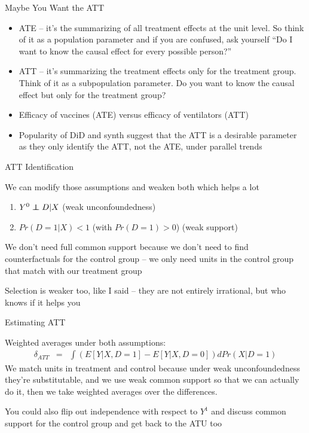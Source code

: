 \documentclass{beamer}
\newcommand\independent{\protect\mathpalette{\protect\independenT}{\perp}}
\def\independenT#1#2{\mathrel{\rlap{$#1#2$}\mkern2mu{#1#2}}}
\begin{document}
\begin{frame}{Maybe You Want the ATT}

\begin{itemize}
\item ATE -- it's the summarizing of all treatment effects at the unit level. So think of it as a population parameter and if you are confused, ask yourself ``Do I want to know the causal effect for every possible person?''
\item ATT -- it's summarizing the treatment effects only for the treatment group.  Think of it as a subpopulation parameter.  Do you want to know the causal effect but only for the treatment group?
\item Efficacy of vaccines (ATE) versus efficacy of ventilators (ATT)
\item Popularity of DiD and synth suggest that the ATT is a desirable parameter as they only identify the ATT, not the ATE, under parallel trends
\end{itemize}

\end{frame}



\begin{frame}{ATT Identification}

We can modify those assumptions and weaken both which helps a lot

\begin{enumerate}
  \item $Y^0 \independent{D} | X$ (weak unconfoundedness)
  \item $Pr(D=1|X)<1$ (with $Pr(D=1)>0$) (weak support)
\end{enumerate}

\bigskip

We don't need full common support because we don't need to find counterfactuals for the control group -- we only need units in the control group that match with our treatment group

\bigskip

Selection is weaker too, like I said -- they are not entirely irrational, but who knows if it helps you

\end{frame}



\begin{frame}{Estimating ATT}


Weighted averages under both assumptions:
		\begin{eqnarray*}
		\delta_{ATT} &=& \int \left(E[Y|X,D=1] - E[Y|X,D=0]\right)dPr(X|D=1)
		\end{eqnarray*}
We match units in treatment and control because under weak unconfoundedness they're substitutable, and we use weak common support so that we can actually do it, then we take weighted averages over the differences.  

\bigskip

You could also flip out independence with respect to $Y^1$ and discuss common support for the control group and get back to the ATU too
	
\end{frame}
\end{document}
